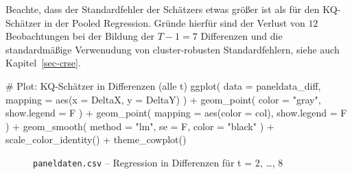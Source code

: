 \documentclass[
  a4paper,
  DIV=11,
  oneside]{scrreprt}
\newenvironment{Shaded}{\begin{snugshade}}{\end{snugshade}}
\newcommand{\AttributeTok}[1]{\textcolor[rgb]{0.40,0.45,0.13}{#1}}
\newcommand{\CommentTok}[1]{\textcolor[rgb]{0.37,0.37,0.37}{#1}}
\newcommand{\FunctionTok}[1]{\textcolor[rgb]{0.28,0.35,0.67}{#1}}
\newcommand{\NormalTok}[1]{\textcolor[rgb]{0.00,0.23,0.31}{#1}}
\newcommand{\SpecialCharTok}[1]{\textcolor[rgb]{0.37,0.37,0.37}{#1}}
\newcommand{\StringTok}[1]{\textcolor[rgb]{0.13,0.47,0.30}{#1}}
\begin{document}
Beachte, dass der Standardfehler der Schätzers etwas größer ist als für
den KQ-Schätzer in der Pooled Regression. Gründe hierfür sind der
Verlust von \(12\) Beobachtungen bei der Bildung der \(T-1 = 7\)
Differenzen und die standardmäßige Verwenudung von cluster-robusten
Standardfehlern, siehe auch Kapitel~\ref{sec-crse}.

\begin{Shaded}
\begin{Highlighting}[]
\CommentTok{\# Plot: KQ{-}Schätzer in Differenzen (alle t)}
\FunctionTok{ggplot}\NormalTok{(}
  \AttributeTok{data =}\NormalTok{ paneldata\_diff,}
  \AttributeTok{mapping =} \FunctionTok{aes}\NormalTok{(}\AttributeTok{x =}\NormalTok{ DeltaX, }\AttributeTok{y =}\NormalTok{ DeltaY)}
\NormalTok{) }\SpecialCharTok{+} 
  \FunctionTok{geom\_point}\NormalTok{(}
    \AttributeTok{color =} \StringTok{"gray"}\NormalTok{,}
    \AttributeTok{show.legend =}\NormalTok{ F}
\NormalTok{  ) }\SpecialCharTok{+}
  \FunctionTok{geom\_point}\NormalTok{(}
    \AttributeTok{mapping =} \FunctionTok{aes}\NormalTok{(}\AttributeTok{color =}\NormalTok{ col),}
    \AttributeTok{show.legend =}\NormalTok{ F}
\NormalTok{  ) }\SpecialCharTok{+}
  \FunctionTok{geom\_smooth}\NormalTok{(}
    \AttributeTok{method =} \StringTok{"lm"}\NormalTok{, }
    \AttributeTok{se =}\NormalTok{ F,}
    \AttributeTok{color =} \StringTok{"black"}
\NormalTok{  ) }\SpecialCharTok{+} 
  \FunctionTok{scale\_color\_identity}\NormalTok{() }\SpecialCharTok{+}
  \FunctionTok{theme\_cowplot}\NormalTok{()}
\end{Highlighting}
\end{Shaded}

\begin{figure}[t]


\caption{\label{fig-diffregression2}\texttt{paneldaten.csv} --
Regression in Differenzen für t = 2, \ldots, 8}

\end{figure}%
\end{document}
